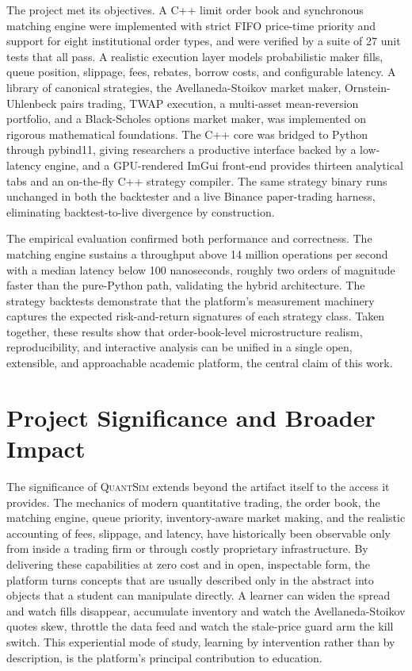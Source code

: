 \documentclass[12pt,oneside,a4paper]{report}
\newcommand{\quantsim}{\textsc{QuantSim}}
\begin{document}
The project met its objectives. A C++ limit order book and synchronous matching engine were implemented with strict FIFO price-time priority and support for eight institutional order types, and were verified by a suite of 27 unit tests that all pass. A realistic execution layer models probabilistic maker fills, queue position, slippage, fees, rebates, borrow costs, and configurable latency. A library of canonical strategies, the Avellaneda-Stoikov market maker, Ornstein-Uhlenbeck pairs trading, TWAP execution, a multi-asset mean-reversion portfolio, and a Black-Scholes options market maker, was implemented on rigorous mathematical foundations. The C++ core was bridged to Python through pybind11, giving researchers a productive interface backed by a low-latency engine, and a GPU-rendered ImGui front-end provides thirteen analytical tabs and an on-the-fly C++ strategy compiler. The same strategy binary runs unchanged in both the backtester and a live Binance paper-trading harness, eliminating backtest-to-live divergence by construction.

The empirical evaluation confirmed both performance and correctness. The matching engine sustains a throughput above 14 million operations per second with a median latency below 100 nanoseconds, roughly two orders of magnitude faster than the pure-Python path, validating the hybrid architecture. The strategy backtests demonstrate that the platform's measurement machinery captures the expected risk-and-return signatures of each strategy class. Taken together, these results show that order-book-level microstructure realism, reproducibility, and interactive analysis can be unified in a single open, extensible, and approachable academic platform, the central claim of this work.

\section{Project Significance and Broader Impact}
\label{sec:impact}

The significance of \quantsim{} extends beyond the artifact itself to the access it provides. The mechanics of modern quantitative trading, the order book, the matching engine, queue priority, inventory-aware market making, and the realistic accounting of fees, slippage, and latency, have historically been observable only from inside a trading firm or through costly proprietary infrastructure. By delivering these capabilities at zero cost and in open, inspectable form, the platform turns concepts that are usually described only in the abstract into objects that a student can manipulate directly. A learner can widen the spread and watch fills disappear, accumulate inventory and watch the Avellaneda-Stoikov quotes skew, throttle the data feed and watch the stale-price guard arm the kill switch. This experiential mode of study, learning by intervention rather than by description, is the platform's principal contribution to education.
\end{document}
